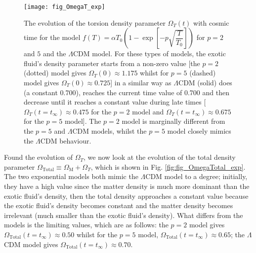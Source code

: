 \documentclass[prl,floatfix,showpacs,twocolumn,preprintnumbers,amsmath,amssymb,superscriptaddress]{revtex4}
\begin{document}
\begin{figure}[h!]
\texttt{[image: fig\_OmegaT\_exp]}
\caption{The evolution of the torsion density parameter $\Omega_T(t)$ with cosmic time for the model $f(T) =\alpha T_0 \left(1 - \exp \left[-p \sqrt{\dfrac{T}{T_0}}\right]\right)$ for $p = 2$ and $5$ and the $\Lambda$CDM model. For these types of models, the exotic fluid's density parameter starts from a non-zero value [the $p = 2$ (dotted) model gives $\Omega_T(0) \approx 1.175$ whilst for $p = 5$ (dashed) model gives $\Omega_T(0) \approx 0.725$] in a similar way as $\Lambda$CDM (solid) does (a constant 0.700), reaches the current time value of 0.700 and then decrease until it reaches a constant value during late times [$\Omega_T\left(t = t_\infty\right) \approx 0.475$ for the $p = 2$ model and $\Omega_T\left(t = t_\infty\right) \approx 0.675$ for the $p = 5$ model]. The $p = 2$ model is marginally different from the $p = 5$ and $\Lambda$CDM models, whilst the $p = 5$ model closely mimics the $\Lambda$CDM behaviour.}
\label{fig:fig_OmegaT_exp}
\end{figure}

Found the evolution of $\Omega_T$, we now look at the evolution of the total density parameter $\Omega_{\text{Total}} \equiv \Omega_\text{M} + \Omega_T$, which is shown in Fig. \ref{fig:fig_OmegaTotal_exp}. The two exponential models both mimic the $\Lambda$CDM model to a degree; initially, they have a high value since the matter density is much more dominant than the exotic fluid's density,  then the total density approaches a constant value because the exotic fluid's density becomes constant and the matter density becomes irrelevant (much smaller than the exotic fluid's density). What differs from the models is the limiting values, which are as follows: the $p = 2$ model gives $\Omega_{\text{Total}}\left(t = t_\infty\right) \approx 0.50$ whilst for the $p = 5$ model, $\Omega_{\text{Total}}\left(t = t_\infty\right) \approx 0.65$; the $\Lambda$CDM model gives $\Omega_{\text{Total}}\left(t = t_\infty\right) \approx 0.70$.
\end{document}
